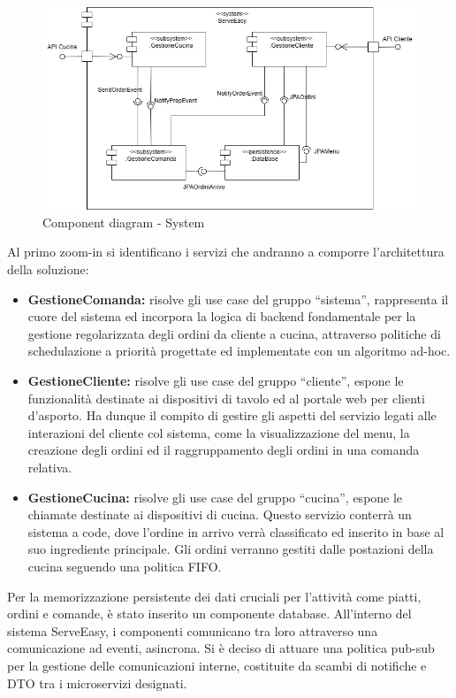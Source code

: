 \begin{figure}[H]
	\centering
	\includegraphics[scale=0.5]{iterazione1/images/ServeEasy_primo_zoomin.jpg}
	\caption{Component diagram - System\label{fig:component_diagram_system}}
\end{figure}
Al primo zoom-in si identificano i servizi che andranno a comporre l’architettura della soluzione:
\begin{itemize}
	\item \textbf{GestioneComanda:} risolve gli use case del gruppo “sistema”, rappresenta il cuore del sistema ed incorpora la logica di backend fondamentale per la gestione regolarizzata degli ordini da cliente a cucina, attraverso politiche di schedulazione a priorità progettate ed implementate con un algoritmo ad-hoc.
	\item \textbf{GestioneCliente:} risolve gli use case del gruppo “cliente”, espone le funzionalità destinate ai dispositivi di tavolo ed al portale web per clienti d’asporto. Ha dunque il compito di gestire gli aspetti del servizio legati alle interazioni del cliente col sistema, come la visualizzazione del menu, la creazione degli ordini ed il raggruppamento degli ordini in una comanda relativa.
	\item \textbf{GestioneCucina:} risolve gli use case del gruppo “cucina”, espone le chiamate destinate ai dispositivi di cucina. Questo servizio conterrà un sistema a code, dove l’ordine in arrivo verrà classificato ed inserito in base al suo ingrediente principale. Gli ordini verranno gestiti dalle postazioni della cucina seguendo una politica FIFO.
\end{itemize}
Per la memorizzazione persistente dei dati cruciali per l’attività come piatti, ordini e comande, è stato inserito un componente database.
All’interno del sistema ServeEasy, i componenti comunicano tra loro attraverso una comunicazione ad eventi, asincrona. Si è deciso di attuare una politica pub-sub per la gestione delle comunicazioni interne, costituite da scambi di notifiche e DTO tra i microservizi designati.

